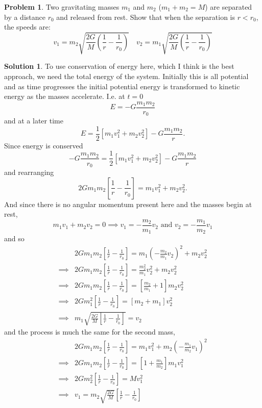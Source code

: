 \documentclass[10pt]{article}
\theoremstyle{definition}
\newtheorem{problem}{Problem}
\newtheorem{soln}{Solution}
\begin{document}
\begin{problem}
Two gravitating masses $m_1$ and $m_2$ ($m_1+m_2=M$) are separated by a distance $r_0$ and
released from rest. Show that when the separation is $r<r_0$, the speeds are:
$$v_1=m_2\sqrt{\frac{2G}{M}\left(\frac{1}{r}-\frac{1}{r_0}\right)}\quad v_2=m_1\sqrt{\frac{2G}{M}\left(\frac{1}{r}-\frac{1}{r_0}\right)}$$
\end{problem}
\begin{soln}
  To use conservation of energy here, which I think is the best approach, we need the total energy of the system. Initially this is all potential and as time progresses the initial potential energy
  is transformed to kinetic energy as the masses accelerate. I.e. at $t=0$
  $$E=-G\frac{m_1m_2}{r_0}$$
  and at a later time
  $$E=\frac{1}{2}\left[m_1v_1^2+m_2v_2^2\right]-G\frac{m_1m_2}{r}.$$
  Since energy is conserved
  $$-G\frac{m_1m_2}{r_0}=\frac{1}{2}\left[m_1v_1^2+m_2v_2^2\right]-G\frac{m_1m_2}{r}$$
  and rearranging
  $$2Gm_1m_2\left[\frac{1}{r}-\frac{1}{r_0}\right]=m_1v_1^2+m_2v_2^2.$$
  And since there is no angular momentum present here and the masses begin at rest,
  $$m_1v_1+m_2v_2=0\implies v_1=-\frac{m_2}{m_1}v_2\text{ and }v_2=-\frac{m_1}{m_2}v_1$$
  and so
  \begin{align*}
             & 2Gm_1m_2\left[\frac{1}{r}-\frac{1}{r_0}\right]=m_1(-\frac{m_2}{m_1}v_2)^2+m_2v_2^2    \\
    \implies & 2Gm_1m_2\left[\frac{1}{r}-\frac{1}{r_0}\right]=\frac{m_2^2}{m_1}v_2^2+m_2v_2^2        \\
    \implies & 2Gm_1m_2\left[\frac{1}{r}-\frac{1}{r_0}\right]=\left[\frac{m_2}{m_1}+1\right]m_2v_2^2 \\
    \implies & 2Gm_1^2\left[\frac{1}{r}-\frac{1}{r_0}\right]=\left[m_2+m_1\right]v_2^2               \\
    \implies & m_1\sqrt{\frac{2G}{M}\left[\frac{1}{r}-\frac{1}{r_0}\right]}=v_2
  \end{align*}
  and the process is much the same for the second mass,
  \begin{align*}
             & 2Gm_1m_2\left[\frac{1}{r}-\frac{1}{r_0}\right]=m_1v_1^2+m_2\left(-\frac{m_1}{m_2}v_1\right)^2 \\
    \implies & 2Gm_1m_2\left[\frac{1}{r}-\frac{1}{r_0}\right]=\left[1+\frac{m_1}{m_2}\right]m_1v_1^2         \\
    \implies & 2Gm_2^2\left[\frac{1}{r}-\frac{1}{r_0}\right]=Mv_1^2                                          \\
    \implies & v_1 =m_2\sqrt{\frac{2G}{M}}\left[\frac{1}{r}-\frac{1}{r_0}\right]
  \end{align*}
\end{soln}
\end{document}
